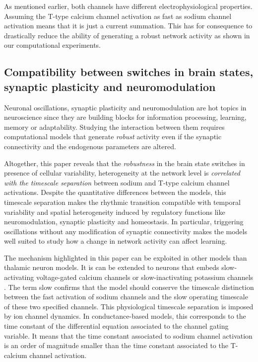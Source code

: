 As mentioned earlier, both channels have different electrophysiological properties. Assuming the T-type calcium channel activation as fast as sodium channel activation means that it is just a current summation. This has for consequence to drastically reduce the ability of generating a robust network activity as shown in our computational experiments. \\

\subsection{Compatibility between switches in brain states, synaptic plasticity and neuromodulation}
Neuronal oscillations, synaptic plasticity and neuromodulation are hot topics in neuroscience since they are building blocks for information processing, learning, memory or adaptability. Studying the interaction between them requires computational models that generate \textit{robust} activity even if the synaptic connectivity and the endogenous parameters are altered. 


Altogether, this paper reveals that the \textit{robustness} in the brain state switches in presence of cellular variability, heterogeneity at the network level is \textit{correlated with the timescale separation} between sodium and T-type calcium channel activations. Despite the quantitative differences between the models, this timescale separation makes the rhythmic transition compatible with temporal variability and spatial heterogeneity induced by regulatory functions like neuromodulation, synaptic plasticity and homeostasis. In particular, triggering oscillations without any modification of synaptic connectivity makes the models  well suited to study how a change in network activity can affect learning. 

The mechanism highlighted in this paper can be exploited in other models than thalamic neuron models. It is can be extended to neurons that embeds slow-activating voltage-gated calcium channels or slow-inactivating potassium channels \citep{franci_balance_2013}. The term slow confirms that the model should conserve the timescale distinction between the fast activation of sodium channels and the slow operating timescale of these two specified channels. This physiological timescale separation is imposed by ion channel dynamics. In conductance-based models, this corresponds to the time constant of the differential equation associated to the channel gating variable. It means that the time constant associated to sodium channel activation is an order of magnitude smaller than the time constant associated to the T-calcium channel activation.

